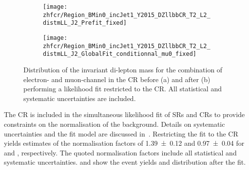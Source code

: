 
\begin{figure}[htbp]
  \centering

  \begin{subfigure}{.485\textwidth}
    \texttt{[image: zhfcr/Region\_BMin0\_incJet1\_Y2015\_DZllbbCR\_T2\_L2\_distmLL\_J2\_Prefit\_fixed]}
    \label{fig:zcr_mll_prefit}
  \end{subfigure}\hfill%
  \begin{subfigure}{.485\textwidth}
    \texttt{[image: zhfcr/Region\_BMin0\_incJet1\_Y2015\_DZllbbCR\_T2\_L2\_distmLL\_J2\_GlobalFit\_conditionnal\_mu0\_fixed]}
    \label{fig:zcr_mll_postfit}
  \end{subfigure}

  \caption[Distribution of the invariant di-lepton mass in the \ZHF~CR.]{
    Distribution of the invariant di-lepton mass for the combination of
    electron- and muon-channel in the \ZHF CR before (a) and after (b)
    performing a likelihood fit restricted to the CR.  All statistical and
    systematic uncertainties are included.}

\end{figure}

The \ZHF CR is included in the simultaneous likelihood fit of SRs and CRs to
provide constraints on the normalisation of the \ZHF background. Details on
systematic uncertainties and the fit model are discussed
in~. Restricting the fit to the
CR yields estimates of the normalisation factors of \num{1.39 \pm 0.12} and
\num{0.97 \pm 0.04} for \ZHF and \ttbar, respectively. The quoted normalisation
factors include all statistical and systematic
uncertainties.  and  show the
event yields and \mll distribution after the fit.

